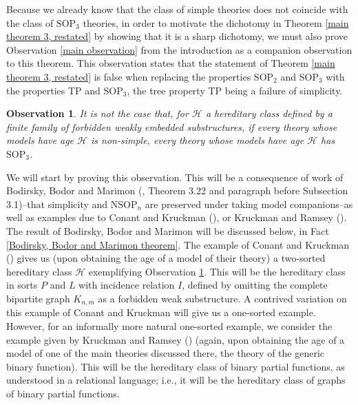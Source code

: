 \documentclass{amsart}
\newtheorem{observation}[theorem]{Observation}
\theoremstyle{definition}
\theoremstyle{remark}
\numberwithin{equation}{section}
\begin{document}
Because we already know that the class of simple theories does not coincide with the class of $\mathrm{SOP}_{3}$ theories, in order to motivate the dichotomy in Theorem \ref{main theorem 3, restated} by showing that it is a sharp dichotomy, we must also prove Observation \ref{main observation} from the introduction as a companion observation to this theorem. This observation states that the statement of Theorem \ref{main theorem 3, restated} is false when replacing the properties $\mathrm{SOP}_{2}$ and $\mathrm{SOP}_{3}$ with the properties $\mathrm{TP}$ and $\mathrm{SOP}_{3}$, the tree property $\mathrm{TP}$ being a failure of simplicity.

\begin{observation}
 \label{main observation, restated}   It is \emph{not} the case that, for $\mathcal{H}$ a hereditary class defined by a finite family of forbidden weakly embedded substructures, if every theory whose models have age $\mathcal{H}$ is non-simple, every theory whose models have age $\mathcal{H}$ has $\mathrm{SOP}_{3}$.
\end{observation}

We will start by proving this observation. This will be a consequence of work of Bodirsky, Bodor and Marimon (\cite{BBM25}, Theorem 3.22 and paragraph before Subsection 3.1)--that simplicity and $\mathrm{NSOP}_{n}$ are preserved under taking model companions--as well as examples due to Conant and Kruckman (\cite{CoK19}), or Kruckman and Ramsey (\cite{KR18}). The result of Bodirsky, Bodor and Marimon will be discussed below, in Fact \ref{Bodirsky, Bodor and Marimon theorem}. The example of Conant and Kruckman (\cite{CoK19}) gives us (upon obtaining the age of a model of their theory) a two-sorted hereditary class $\mathcal{H}$ exemplifying Observation \ref{main observation, restated}. This will be the hereditary class in sorts $P$ and $L$ with incidence relation $I$, defined by omitting the complete bipartite graph $K_{n,m}$ as a forbidden weak substructure. A contrived variation on this example of Conant and Kruckman will give us a one-sorted example. However, for an informally more natural one-sorted example, we consider the example given by Kruckman and Ramsey (\cite{KR17}) (again, upon obtaining the age of a model of one of the main theories discussed there, the theory of the generic binary function). This will be the hereditary class of binary partial functions, as understood in a relational language; i.e., it will be the hereditary class of graphs of binary partial functions.
\end{document}
